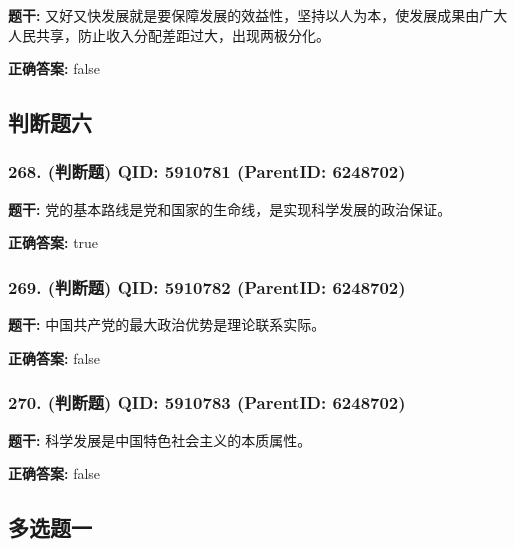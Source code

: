 \documentclass[12pt,UTF8]{ctexart}
\begin{document}
\textbf{题干:}
又好又快发展就是要保障发展的效益性，坚持以人为本，使发展成果由广大人民共享，防止收入分配差距过大，出现两极分化。



\textbf{正确答案:}
false

\vspace{0.3em}\hrulefill\vspace{0.7em}

\subsection*{判断题六}

\subsubsection*{268. (判断题) \small QID: 5910781 (ParentID: 6248702)}

\textbf{题干:}
党的基本路线是党和国家的生命线，是实现科学发展的政治保证。



\textbf{正确答案:}
true

\vspace{0.3em}\hrulefill\vspace{0.7em}

\subsubsection*{269. (判断题) \small QID: 5910782 (ParentID: 6248702)}

\textbf{题干:}
中国共产党的最大政治优势是理论联系实际。



\textbf{正确答案:}
false

\vspace{0.3em}\hrulefill\vspace{0.7em}

\subsubsection*{270. (判断题) \small QID: 5910783 (ParentID: 6248702)}

\textbf{题干:}
科学发展是中国特色社会主义的本质属性。



\textbf{正确答案:}
false

\vspace{0.3em}\hrulefill\vspace{0.7em}

\subsection*{多选题一}
\end{document}
